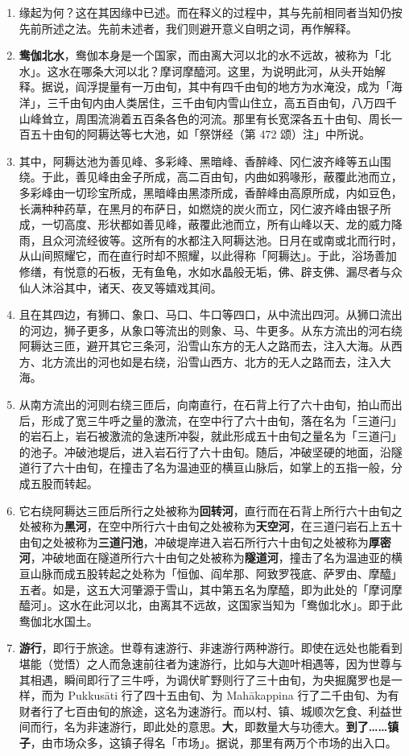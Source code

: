 \begin{enumerate}\item 缘起为何？这在其因缘中已述。而在释义的过程中，其与先前相同者当知仍按先前所述之法。先前未述者，我们则避开意义自明之词，再作解释。
\item \textbf{鸯伽北水}，鸯伽本身是一个国家，而由离大河以北的水不远故，被称为「北水」。这水在哪条大河以北？摩诃摩醯河。这里，为说明此河，从头开始解释。据说，阎浮提量有一万由旬，其中有四千由旬的地方为水淹没，成为「海洋」，三千由旬内由人类居住，三千由旬内雪山住立，高五百由旬，八万四千山峰耸立，周围流淌着五百条各色的河流。那里有长宽深各五十由旬、周长一百五十由旬的阿耨达等七大池，如「祭饼经（第 472 颂）注」中所说。
\item 其中，阿耨达池为善见峰、多彩峰、黑暗峰、香醉峰、冈仁波齐峰等五山围绕。于此，善见峰由金子所成，高二百由旬，内曲如鸦喙形，蔽覆此池而立，多彩峰由一切珍宝所成，黑暗峰由黑漆所成，香醉峰由高原所成，内如豆色，长满种种药草，在黑月的布萨日，如燃烧的炭火而立，冈仁波齐峰由银子所成，一切高度、形状都如善见峰，蔽覆此池而立，所有山峰以天、龙的威力降雨，且众河流经彼等。这所有的水都注入阿耨达池。日月在或南或北而行时，从山间照耀它，而在直行时却不照耀，以此得称「阿耨达」。于此，浴场善加修缮，有悦意的石板，无有鱼龟，水如水晶般无垢，佛、辟支佛、漏尽者与众仙人沐浴其中，诸天、夜叉等嬉戏其间。
\item 且在其四边，有狮口、象口、马口、牛口等四口，从中流出四河。从狮口流出的河边，狮子更多，从象口等流出的则象、马、牛更多。从东方流出的河右绕阿耨达三匝，避开其它三条河，沿雪山东方的无人之路而去，注入大海。从西方、北方流出的河也如是右绕，沿雪山西方、北方的无人之路而去，注入大海。
\item 从南方流出的河则右绕三匝后，向南直行，在石背上行了六十由旬，拍山而出后，形成了宽三牛呼之量的激流，在空中行了六十由旬，落在名为「三道闩」的岩石上，岩石被激流的急速所冲裂，就此形成五十由旬之量名为「三道闩」的池子。冲破池堤后，进入岩石行了六十由旬。随后，冲破坚硬的地面，沿隧道行了六十由旬，在撞击了名为温迪亚的横亘山脉后，如掌上的五指一般，分成五股而转起。
\item 它右绕阿耨达三匝后所行之处被称为\textbf{回转河}，直行而在石背上所行六十由旬之处被称为\textbf{黑河}，在空中所行六十由旬之处被称为\textbf{天空河}，在三道闩岩石上五十由旬之处被称为\textbf{三道闩池}，冲破堤岸进入岩石所行六十由旬之处被称为\textbf{厚密河}，冲破地面在隧道所行六十由旬之处被称为\textbf{隧道河}，撞击了名为温迪亚的横亘山脉而成五股转起之处称为「恒伽、阎牟那、阿致罗筏底、萨罗由、摩醯」五者。如是，这五大河肇源于雪山，其中第五名为摩醯，即为此处的「摩诃摩醯河」。这水在此河以北，由离其不远故，这国家当知为「鸯伽北水」。即于此鸯伽北水国土。
\item \textbf{游行}，即行于旅途。世尊有速游行、非速游行两种游行。即使在远处也能看到堪能（觉悟）之人而急速前往者为速游行，比如与大迦叶相遇等，因为世尊与其相遇，瞬间即行了三牛呼，为调伏旷野则行了三十由旬，为央掘魔罗也是一样，而为 Pukkusāti 行了四十五由旬、为 Mahākappina 行了二千由旬、为有财者行了七百由旬的旅途，这名为速游行。而以村、镇、城顺次乞食、利益世间而行，名为非速游行，即此处的意思。\textbf{大}，即数量大与功德大。\textbf{到了……镇子}，由市场众多，这镇子得名「市场」。据说，那里有两万个市场的出入口。\end{enumerate}

